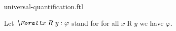 \documentclass{stex}
\begin{document}
\begin{smodule}{universal-quantification.ftl}



\begin{fakeforthel}
  \begin{convention}[for=Forall]
    Let $\emph{\Forall} x \mathrel{R} y : \varphi$ stand for for all $x \mathrel{R} y$ we have $\varphi$.
  \end{convention}
\end{fakeforthel}

\end{smodule}
\end{document}
